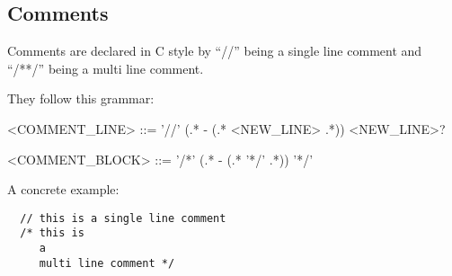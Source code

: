 \subsection{Comments}
\label{subsec:comments}

Comments are declared in C style by \enquote{//} being a single line comment and \enquote{/**/} being a multi line comment.

They follow this grammar:

\begin{grammar}
  <COMMENT\_LINE> ::= '//' (.* - (.* <NEW\_LINE> .*)) <NEW\_LINE>?
\end{grammar}
\begin{grammar}
  <COMMENT\_BLOCK> ::= '/*' (.* - (.* '*/' .*)) '*/'
\end{grammar}

A concrete example:

\begin{verbatim}
  // this is a single line comment
  /* this is
     a
     multi line comment */
\end{verbatim}
